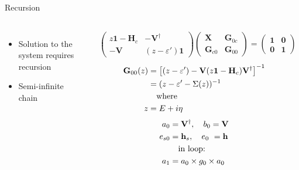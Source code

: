 \documentclass[hyperref={colorlinks=true,urlcolor=blue,linkcolor=.},aspectratio=1610,mathserif]{beamer}
\begin{document}
\begin{frame}{Recursion}
	\begin{overprint}
		\begin{center}
			\begin{columns}[c]
				\begin{itemize}
				    \item Solution to the system requires recursion
					\item Semi-infinite chain
				\end{itemize}
				\begin{align*}
					 & \begin{pmatrix}
						z\mathbf{1}-\mathbf{H}_c & -\mathbf{V}^{\dagger} \\ -\mathbf{V} & (z-\varepsilon')\mathbf{1}
					\end{pmatrix}
					\begin{pmatrix}
						\mathbf{X}      & \mathbf{G}_{0c} \\
						\mathbf{G}_{c0} & \mathbf{G}_{00}
					\end{pmatrix}
					=
					\begin{pmatrix}
						\mathbf{1} & \mathbf{0} \\
						\mathbf{0} & \mathbf{1}
					\end{pmatrix}
				\end{align*}
				\begin{align*}
					\mathbf{G}_{00}(z) & = \left[(z-\varepsilon')-\vb{V}(z\vb{1}-\vb{H}_c)\vb{V}^{\dagger}\right]^{-1} \\
					                   & = (z-\varepsilon'-\Sigma(z))^{-1}                                             \\
					                   & \qq{where}                                                                    \\
					z                  & = E+i\eta                                                                     \\
				\end{align*}
				\begin{align*}
					a_0           & = \vb{V}^{\dagger}, \quad b_0 = \vb{V}                        \\
					e_{s0}        & = \vb{h}_s, \quad e_0\ = \vb{h}                               \\
					              & \qq{in loop:}                                                 \\
					a_1           & = a_0 \times g_0 \times a_0                                   \\

\end{align*}
\end{columns}
\end{center}
\end{overprint}
\end{frame}
\end{document}
